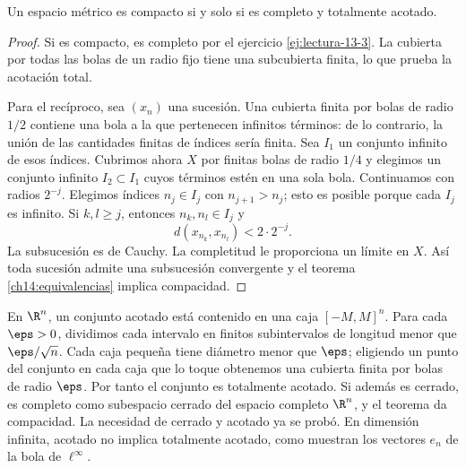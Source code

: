 \begin{teorema}\label{ch15:criterio}
Un espacio métrico es compacto si y solo si es completo y totalmente acotado.
\end{teorema}
\begin{proof}
Si es compacto, es completo por el ejercicio \ref{ej:lectura-13-3}. La cubierta por todas las bolas de un radio fijo tiene una subcubierta finita, lo que prueba la acotación total.

Para el recíproco, sea $(x_n)$ una sucesión. Una cubierta finita por bolas de radio $1/2$ contiene una bola a la que pertenecen infinitos términos: de lo contrario, la unión de las cantidades finitas de índices sería finita. Sea $I_1$ un conjunto infinito de esos índices. Cubrimos ahora $X$ por finitas bolas de radio $1/4$ y elegimos un conjunto infinito $I_2\subset I_1$ cuyos términos estén en una sola bola. Continuamos con radios $2^{-j}$. Elegimos índices $n_j\in I_j$ con $n_{j+1}>n_j$; esto es posible porque cada $I_j$ es infinito. Si $k,l\ge j$, entonces $n_k,n_l\in I_j$ y
\[
d(x_{n_k},x_{n_l})<2\cdot2^{-j}.
\]
La subsucesión es de Cauchy. La completitud le proporciona un límite en $X$. Así toda sucesión admite una subsucesión convergente y el teorema \ref{ch14:equivalencias} implica compacidad.
\end{proof}

\begin{observacion}
En $\R^n$, un conjunto acotado está contenido en una caja $[-M,M]^n$. Para cada $\eps>0$, dividimos cada intervalo en finitos subintervalos de longitud menor que $\eps/\sqrt n$. Cada caja pequeña tiene diámetro menor que $\eps$; eligiendo un punto del conjunto en cada caja que lo toque obtenemos una cubierta finita por bolas de radio $\eps$. Por tanto el conjunto es totalmente acotado. Si además es cerrado, es completo como subespacio cerrado del espacio completo $\R^n$, y el teorema da compacidad. La necesidad de cerrado y acotado ya se probó. En dimensión infinita, acotado no implica totalmente acotado, como muestran los vectores $e_n$ de la bola de $\ell^\infty$.
\end{observacion}

